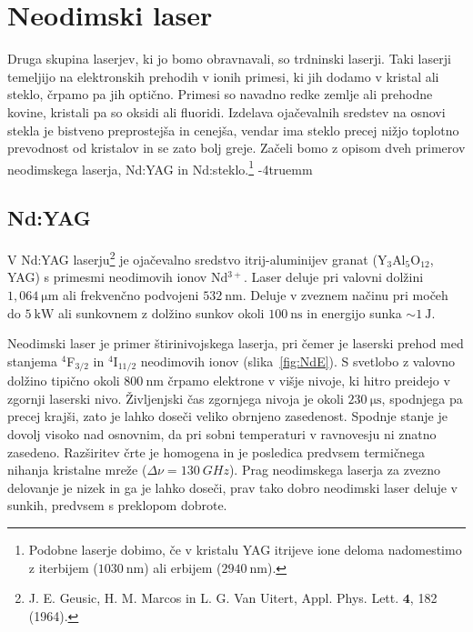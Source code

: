 \section{Neodimski laser}
Druga skupina laserjev, ki jo bomo obravnavali, so trdninski laserji. Taki laserji
temeljijo na elektronskih prehodih v ionih primesi, ki jih dodamo v kristal ali steklo,
črpamo pa jih optično. Primesi so navadno redke zemlje ali prehodne kovine, 
kristali pa so oksidi ali fluoridi. Izdelava ojačevalnih sredstev na osnovi stekla
je bistveno preprostejša in cenejša, vendar ima steklo precej nižjo toplotno prevodnost
od kristalov in se zato bolj greje. 
Začeli bomo z opisom dveh primerov neodimskega laserja, Nd:YAG
in Nd:steklo.\footnote{
Podobne laserje dobimo, če v kristalu YAG itrijeve ione deloma
nadomestimo z iterbijem ($1030~\si{\nano\metre}$) ali 
erbijem ($2940~\si{\nano\metre}$).} 
\vglue-4truemm
\subsection{Nd:YAG}
V Nd:YAG laserju\footnote{J. E. Geusic,
H. M. Marcos in L. G. Van Uitert, Appl. Phys. Lett. $\mathbf{4}$, 182 (1964).} je ojačevalno sredstvo
itrij-aluminijev granat (Y$_3$Al$_5$O$_{12}$, YAG) s primesmi neodimovih ionov Nd$^{3+}$. 
Laser deluje pri valovni dolžini $1,064~\si{\micro\meter}$ ali frekvenčno podvojeni
$532~\si{\nano\metre}$. Deluje v zveznem 
načinu pri močeh do $5~\si{\kilo\watt}$ ali sunkovnem z dolžino sunkov okoli 
$100~\si{\nano\second}$ in energijo sunka $\sim 1~\si{\joule}$.

Neodimski laser je primer štirinivojskega laserja, 
pri čemer je 
laserski prehod med stanjema $^4$F$_{3/2}$ in $^4$I$_{11/2}$ neodimovih ionov 
(slika~\ref{fig:NdE}). S svetlobo z valovno dolžino tipično 
okoli $800~\si{\nano\metre}$ črpamo elektrone v višje nivoje, ki hitro 
preidejo v zgornji laserski nivo. Življenjski čas zgornjega nivoja je 
okoli $230~\si{\micro\second}$, spodnjega pa precej krajši, zato je 
lahko doseči veliko obrnjeno zasedenost. Spodnje stanje je dovolj visoko nad 
osnovnim, da pri sobni temperaturi v ravnovesju ni znatno zasedeno. 
Razširitev črte je homogena in je posledica predvsem 
termičnega nihanja kristalne mreže ($\Delta \nu = 130~\si{GHz}$). 
Prag neodimskega laserja za zvezno delovanje je nizek in ga je lahko doseči, 
prav tako dobro neodimski laser deluje v sunkih, predvsem s preklopom dobrote.

